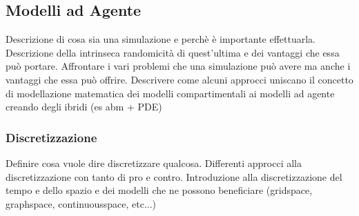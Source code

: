 \subsection{Modelli ad Agente}
Descrizione di cosa sia una simulazione e perchè è importante effettuarla. Descrizione della intrinseca randomicità di quest'ultima e dei vantaggi che essa può
portare. Affrontare i vari problemi che una simulazione può avere ma anche i 
vantaggi che essa può offrire. 
Descrivere come alcuni approcci uniscano il concetto di modellazione matematica
dei modelli compartimentali ai modelli ad agente creando degli ibridi (es abm + PDE)

\subsubsection{Discretizzazione}
Definire cosa vuole dire discretizzare qualcosa. Differenti approcci alla 
discretizzazione con tanto di pro e contro. 
Introduzione alla discretizzazione del tempo e dello spazio e dei modelli 
che ne possono beneficiare (gridspace, graphspace, continuousspace, etc...)
